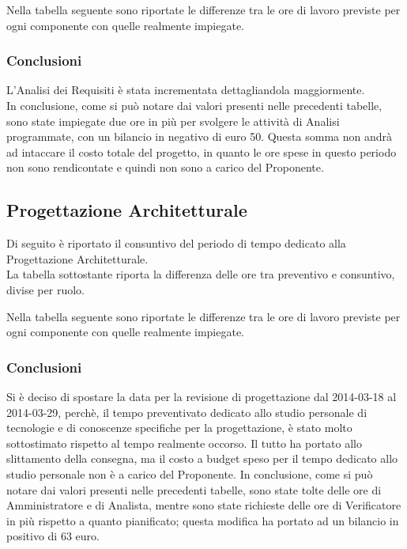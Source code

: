 
Nella tabella seguente sono riportate le differenze tra le ore di lavoro previste per ogni componente con quelle realmente impiegate.


\subsubsection{Conclusioni}
L'Analisi dei Requisiti è stata incrementata dettagliandola maggiormente.\\
In conclusione, come si può notare dai valori presenti nelle precedenti tabelle, sono state impiegate due ore in più per svolgere le attività di Analisi programmate, con un bilancio in negativo di euro 50. Questa somma non andrà ad intaccare il costo totale del progetto, in quanto le ore spese in questo periodo non sono rendicontate e quindi non sono a carico del Proponente.

\subsection{Progettazione Architetturale}
Di seguito è riportato il consuntivo del periodo di tempo dedicato alla Progettazione Architetturale.\\
La tabella sottostante riporta la differenza delle ore tra preventivo e consuntivo, divise per ruolo.


Nella tabella seguente sono riportate le differenze tra le ore di lavoro previste per ogni componente con quelle realmente impiegate.


\subsubsection{Conclusioni}
Si è deciso di spostare la data per la revisione di progettazione dal 2014-03-18 al 2014-03-29, perchè, il tempo preventivato dedicato allo studio personale di tecnologie e di conoscenze specifiche per la progettazione, è stato molto sottostimato rispetto al tempo realmente occorso. Il tutto ha portato allo slittamento della consegna, ma il costo a budget speso per il tempo dedicato allo studio personale non è a carico del Proponente.
In conclusione, come si può notare dai valori presenti nelle precedenti tabelle, sono state tolte delle ore di Amministratore e di Analista, mentre sono state richieste delle ore di Verificatore in più rispetto a quanto pianificato; questa modifica ha portato ad un bilancio in positivo di 63 euro.
